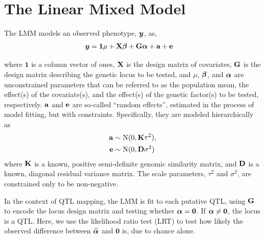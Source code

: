 


\section{The Linear Mixed Model}
The LMM models an observed phenotype, $\bm{y}$, as,
\begin{align}
	\bm{y}	&= \mathbf{1}\mu + \mathbf{X}\boldsymbol{\beta} + \mathbf{G}\boldsymbol{\alpha} + \mathbf{a} + \mathbf{e}  \label{eq:lmm}
\end{align}

where $\mathbf{1}$ is a column vector of ones, $\mathbf{X}$ is the design matrix of covariates, $\mathbf{G}$ is the design matrix describing the genetic locus to be tested, and $\mu$, $\boldsymbol{\beta}$, and $\boldsymbol{\alpha}$ are unconstrained parameters that can be referred to as the population mean, the effect(s) of the covariate(s), and the effect(s) of the genetic factor(s) to be tested, respectively.
$\mathbf{a}$ and $\mathbf{e}$ are so-called ``random effects'', estimated in the process of model fitting, but with constraints.
Specifically, they are modeled hierarchically as
\begin{align}
    \mathbf{a} &\sim \mathrm{N}(0, \mathbf{K} \tau^2) ,   \label{eq:a}\\
    \mathbf{e} &\sim \mathrm{N}(0, \mathbf{D} \sigma^2)   \label{eq:e}
\end{align}
where $\mathbf{K}$ is a known, positive semi-definite genomic similarity matrix, and $\mathbf{D}$ is a known, diagonal residual variance matrix.
The scale parameters, $\tau^2$ and $\sigma^2$, are constrained only to be non-negative.

In the context of QTL mapping, the LMM is fit to each putative QTL, using $\mathbf{G}$ to encode the locus design matrix and testing whether $\boldsymbol{\alpha} = \bm{0}$.
If $\boldsymbol{\alpha} \neq \bm{0}$, the locus is a QTL.
Here, we use the likelihood ratio test (LRT) to test how likely the observed difference between $\widehat{\boldsymbol{\alpha}}$ and $\bm{0}$ is, due to chance alone.

